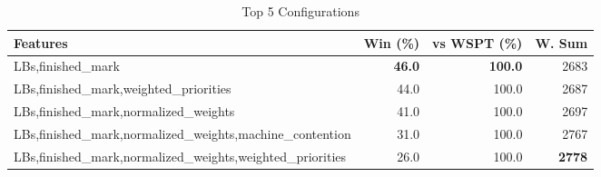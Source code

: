 \begin{table}[htbp]%
\centering%
\begin{tabular}{lrrr}%
\toprule%
\textbf{Features}&\textbf{Win (\%)}&\textbf{vs WSPT (\%)}&\textbf{W. Sum}\\%
\midrule%
LBs,finished_mark&\textbf{46.0}&\textbf{100.0}&2683\\%
LBs,finished_mark,weighted_priorities&44.0&100.0&2687\\%
LBs,finished_mark,normalized_weights&41.0&100.0&2697\\%
LBs,finished_mark,normalized_weights,machine_contention&31.0&100.0&2767\\%
LBs,finished_mark,normalized_weights,weighted_priorities&26.0&100.0&\textbf{2778}\\%
\bottomrule%
\end{tabular}%
\caption{Top 5 Configurations}%
\label{tab:summary}%
\end{table}